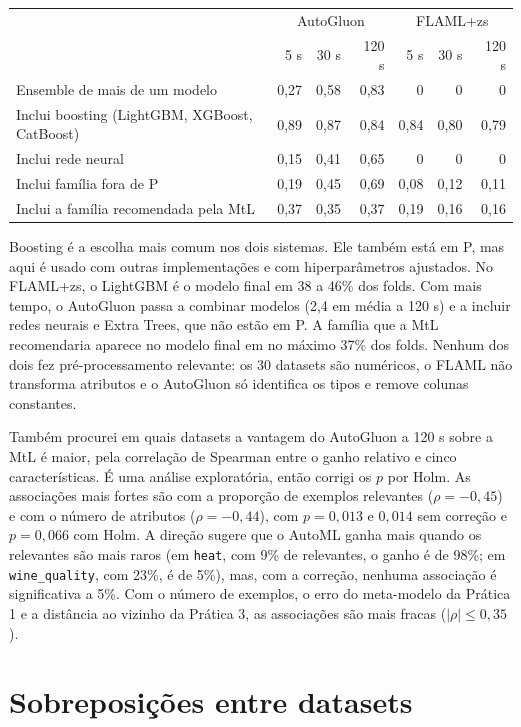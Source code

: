\documentclass[10pt,a4paper]{article}
\begin{document}
\begin{center}\small
\begin{tabular}{lrrrrrr}
\toprule
 & \multicolumn{3}{c}{AutoGluon} & \multicolumn{3}{c}{FLAML+zs} \\
 & 5 s & 30 s & 120 s & 5 s & 30 s & 120 s \\
\midrule
Ensemble de mais de um modelo & 0,27 & 0,58 & 0,83 & 0 & 0 & 0 \\
Inclui boosting (LightGBM, XGBoost, CatBoost) & 0,89 & 0,87 & 0,84 & 0,84 & 0,80 & 0,79 \\
Inclui rede neural & 0,15 & 0,41 & 0,65 & 0 & 0 & 0 \\
Inclui família fora de P & 0,19 & 0,45 & 0,69 & 0,08 & 0,12 & 0,11 \\
Inclui a família recomendada pela MtL & 0,37 & 0,35 & 0,37 & 0,19 & 0,16 & 0,16 \\
\bottomrule
\end{tabular}
\end{center}

Boosting é a escolha mais comum nos dois sistemas. Ele também está em P, mas aqui é usado com outras implementações e com hiperparâmetros ajustados. No FLAML+zs, o LightGBM é o modelo final em 38 a 46\% dos folds. Com mais tempo, o AutoGluon passa a combinar modelos (2,4 em média a 120 s) e a incluir redes neurais e Extra Trees, que não estão em P. A família que a MtL recomendaria aparece no modelo final em no máximo 37\% dos folds. Nenhum dos dois fez pré-processamento relevante: os 30 datasets são numéricos, o FLAML não transforma atributos e o AutoGluon só identifica os tipos e remove colunas constantes.

Também procurei em quais datasets a vantagem do AutoGluon a 120 s sobre a MtL é maior, pela correlação de Spearman entre o ganho relativo e cinco características. É uma análise exploratória, então corrigi os $p$ por Holm. As associações mais fortes são com a proporção de exemplos relevantes ($\rho=-0{,}45$) e com o número de atributos ($\rho=-0{,}44$), com $p=0{,}013$ e $0{,}014$ sem correção e $p=0{,}066$ com Holm. A direção sugere que o AutoML ganha mais quando os relevantes são mais raros (em \texttt{heat}, com 9\% de relevantes, o ganho é de 98\%; em \texttt{wine\_quality}, com 23\%, é de 5\%), mas, com a correção, nenhuma associação é significativa a 5\%. Com o número de exemplos, o erro do meta-modelo da Prática 1 e a distância ao vizinho da Prática 3, as associações são mais fracas ($|\rho|\leq0{,}35$).

\section{Sobreposições entre datasets}
\end{document}
